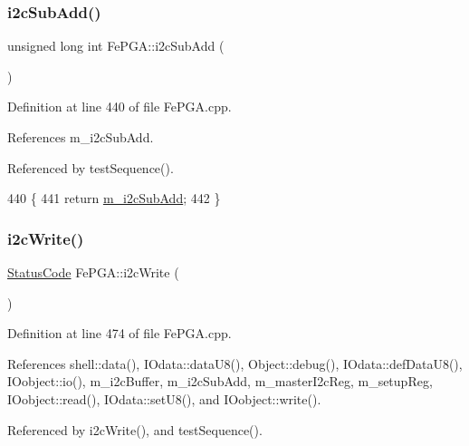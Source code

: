 \subsubsection{\texorpdfstring{i2c\+Sub\+Add()}{i2cSubAdd()}}
{\footnotesize\ttfamily unsigned long int Fe\+P\+G\+A\+::i2c\+Sub\+Add (\begin{DoxyParamCaption}{ }\end{DoxyParamCaption})}



Definition at line 440 of file Fe\+P\+G\+A.\+cpp.



References m\+\_\+i2c\+Sub\+Add.



Referenced by test\+Sequence().


\begin{DoxyCode}
440                                   \{
441   \textcolor{keywordflow}{return} \hyperlink{classFePGA_aba8c2c8d8e0d136826b9dd4c2d7c2e90}{m\_i2cSubAdd}; 
442 \}
\end{DoxyCode}
\mbox{\label{classFePGA_a27b9c9bb486cea35b1bbcac5da96f527}} 
\subsubsection{\texorpdfstring{i2c\+Write()}{i2cWrite()}\hspace{0.1cm}{\footnotesize\ttfamily [1/2]}}
{\footnotesize\ttfamily \hyperlink{classStatusCode}{Status\+Code} Fe\+P\+G\+A\+::i2c\+Write (\begin{DoxyParamCaption}{ }\end{DoxyParamCaption})}



Definition at line 474 of file Fe\+P\+G\+A.\+cpp.



References shell\+::data(), I\+Odata\+::data\+U8(), Object\+::debug(), I\+Odata\+::def\+Data\+U8(), I\+Oobject\+::io(), m\+\_\+i2c\+Buffer, m\+\_\+i2c\+Sub\+Add, m\+\_\+master\+I2c\+Reg, m\+\_\+setup\+Reg, I\+Oobject\+::read(), I\+Odata\+::set\+U8(), and I\+Oobject\+::write().



Referenced by i2c\+Write(), and test\+Sequence().



